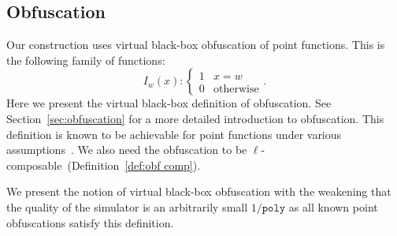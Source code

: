 \documentclass[11pt]{article}
\newcommand{\secref}[1]{\mbox{Section~\ref{#1}}}
\newcommand{\apref}[1]{\mbox{Appendix~\ref{#1}}}
\newcommand{\defref}[1]{\mbox{Definition~\ref{#1}}}
\newcommand{\class}[1]{{\ensuremath{\mathsf{#1}}}}
\newcommand{\neigh}{\ensuremath{\class{Neigh}}\xspace}
\newcommand{\poly}{\ensuremath{\mathtt{poly}}\xspace}
\newtheorem{lemma}[theorem]{Lemma}
\newtheorem{definition}[theorem]{Definition}
\newcommand{\authnote}[2]{{\textcolor{red}{\textsf{#1 notes: }\textcolor{blue}{ #2}}\marginpar{\textcolor{red}{\textbf{!!!!!}}}}}
\newcommand{\authnote}[2]{}
\newcommand{\bnote}[1]{{\authnote{Ben}{#1}}}
\begin{document}
%
%
%

\subsection{Obfuscation}
Our construction uses virtual black-box obfuscation of point functions.  This is the following family of functions:
\[
I_w(x):\begin{cases} 1 & x=w\\0 & \text{otherwise}\end{cases}.
\]
Here we present the virtual black-box definition of obfuscation.  See \secref{sec:obfuscation} for a more detailed introduction to obfuscation.  This definition is known to be achievable for point functions under various assumptions~\cite{canetti1997towards, wee2005obfuscating}.  We also need the obfuscation to be $\ell$-composable~(\defref{def:obf comp}).

We present the notion of virtual black-box obfuscation with the weakening that the quality of the simulator is an arbitrarily small $1/\poly$ as all known point obfuscations satisfy this definition.
\end{document}
